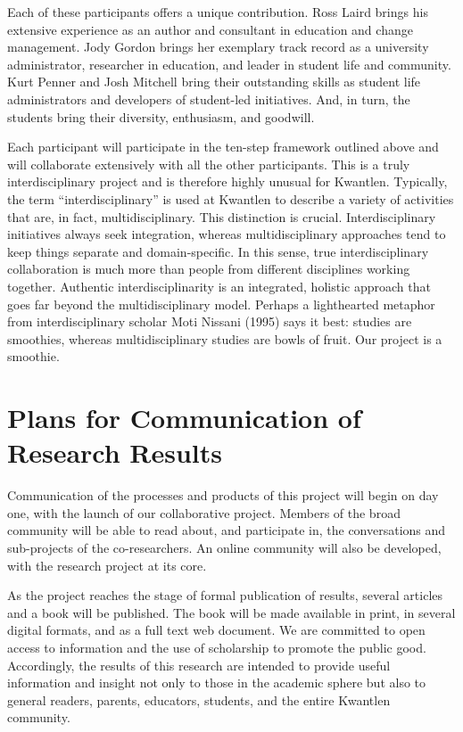 \documentclass[letterpaper,10pt,headsepline]{scrreprt}
\begin{document}
Each of these participants offers a unique contribution. Ross Laird brings his
extensive experience as an author and consultant in education and change
management. Jody Gordon brings her exemplary track record as a university
administrator, researcher in education, and leader in student life and
community. Kurt Penner and Josh Mitchell bring their outstanding skills as
student life administrators and developers of student-led initiatives. And,
in turn, the students bring their diversity, enthusiasm, and goodwill.

Each participant will participate in the ten-step framework outlined above and
will collaborate extensively with all the other participants. This is a truly
interdisciplinary project and is therefore highly unusual for Kwantlen.
Typically, the term ``interdisciplinary'' is used at Kwantlen to describe a
variety of activities that are, in fact, multidisciplinary. This distinction
is crucial. Interdisciplinary initiatives always seek integration, whereas
multidisciplinary approaches tend to keep things separate and domain-specific.
In this sense, true interdisciplinary collaboration is much more than people
from different disciplines working together. Authentic interdisciplinarity is
an integrated, holistic approach that goes far beyond the multidisciplinary
model. Perhaps a lighthearted metaphor from interdisciplinary scholar Moti
Nissani (1995) says it best: studies are smoothies, whereas multidisciplinary
studies are bowls of fruit. Our project is a smoothie.

\section{Plans for Communication of Research Results}


Communication of the processes and products of this project will begin on day
one, with the launch of our collaborative project. Members of the broad
community will be able to read about, and participate in, the conversations
and sub-projects of the co-researchers. An online community will also be
developed, with the research project at its core.

As the project reaches the stage of formal publication of results, several
articles and a book will be published. The book will be made available in
print, in several digital formats, and as a full text web document. We are
committed to open access to information and the use of scholarship to promote
the public good. Accordingly, the results of this research are intended to
provide useful information and insight not only to those in the academic
sphere but also to general readers, parents, educators, students, and the
entire Kwantlen community.
\end{document}

